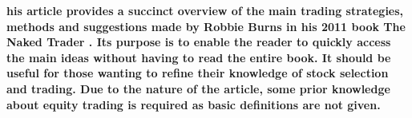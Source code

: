 \textbf{his article provides a succinct overview of the main trading strategies, methods and suggestions made by Robbie Burns in his 2011 book The Naked Trader \cite{burns2011}. Its purpose is to enable the reader to quickly access the main ideas without having to read the entire book. It should be useful for those wanting to refine their knowledge of stock selection and trading. Due to the nature of the article, some prior knowledge about equity trading is required as basic definitions are not given.} 
